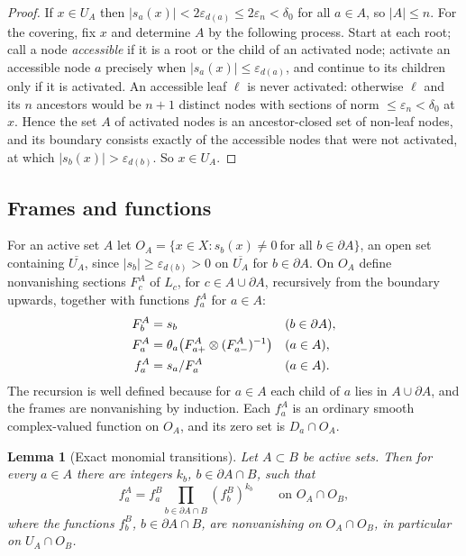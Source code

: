 \documentclass[11pt]{article}
\newtheorem{lemma}[theorem]{Lemma}
\theoremstyle{remark}
\newcommand{\eps}{\varepsilon}
\begin{document}
\begin{proof}
If $x\in U_A$ then $|s_a(x)|<2\eps_{d(a)}\le2\eps_n<\delta_0$ for all
$a\in A$, so $|A|\le n$. For the covering, fix $x$ and determine $A$ by
the following process. Start at each root; call a node
\emph{accessible} if it is a root or the child of an activated node;
activate an accessible node $a$ precisely when $|s_a(x)|\le\eps_{d(a)}$,
and continue to its children only if it is activated. An accessible
leaf $\ell$ is never activated: otherwise $\ell$ and its $n$ ancestors
would be $n+1$ distinct nodes with sections of norm
$\le\eps_n<\delta_0$ at $x$. Hence the set $A$ of activated nodes is an
ancestor-closed set of non-leaf nodes, and its boundary consists
exactly of the accessible nodes that were not activated, at which
$|s_b(x)|>\eps_{d(b)}$. So $x\in U_A$.
\end{proof}

\subsection*{Frames and functions}
For an active set $A$ let
$O_A=\{x\in X: s_b(x)\ne0\ \text{for all }b\in\partial A\}$, an open
set containing $\overline{U_A}$, since $|s_b|\ge\eps_{d(b)}>0$ on
$\overline{U_A}$ for $b\in\partial A$. On $O_A$ define nonvanishing
sections $F^A_c$ of $L_c$, for $c\in A\cup\partial A$, recursively from
the boundary upwards, together with functions $f^A_a$ for $a\in A$:
\begin{align}
 F^A_b&=s_b &&(b\in\partial A),\label{eq:frames}\\
 F^A_a&=\theta_a\bigl(F^A_{a+}\otimes(F^A_{a-})^{-1}\bigr) &&(a\in A),\notag\\
 f^A_a&=s_a/F^A_a &&(a\in A).\label{eq:functions}
\end{align}
The recursion is well defined because for $a\in A$ each child of $a$
lies in $A\cup\partial A$, and the frames are nonvanishing by
induction. Each $f^A_a$ is an ordinary smooth complex-valued function
on $O_A$, and its zero set is $D_a\cap O_A$.

\begin{lemma}[Exact monomial transitions]\label{lem:monomial}
Let $A\subset B$ be active sets. Then for every $a\in A$ there are
integers $k_b$, $b\in\partial A\cap B$, such that
\begin{equation}\label{eq:monomial}
 f^A_a=f^B_a\prod_{b\in\partial A\cap B}(f^B_b)^{k_b}
 \qquad\text{on }O_A\cap O_B,
\end{equation}
where the functions $f^B_b$, $b\in\partial A\cap B$, are nonvanishing
on $O_A\cap O_B$, in particular on $U_A\cap O_B$.
\end{lemma}
\end{document}
